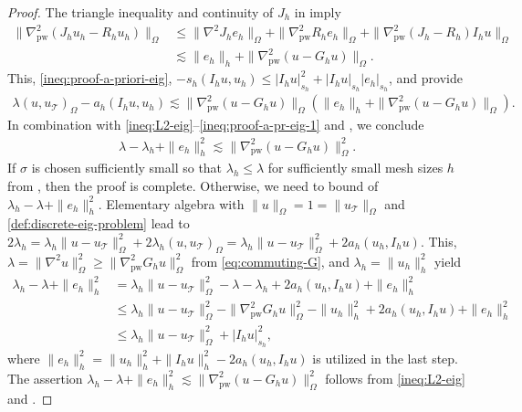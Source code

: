 \documentclass[a4paper]{amsart}
\numberwithin{equation}{section}
\def\T{\mathcal{T}}
\def\pw{\mathrm{pw}}
\theoremstyle{definition}
\theoremstyle{remark}
\numberwithin{theorem}{section}
\numberwithin{equation}{section}
\numberwithin{table}{section}
\numberwithin{figure}{section}
\begin{document}
\begin{proof}
	The triangle inequality and continuity of $J_h$ in  imply
	\begin{align*}
		\|\nabla_\pw^2(J_h u_h - R_h u_h)\|_\Omega &\leq \|\nabla^2 J_h e_h\|_\Omega + \|\nabla_\pw^2 R_h e_h\|_\Omega + \|\nabla_\pw^2 (J_h - R_h) I_h u\|_\Omega\\
		& \lesssim \|e_h\|_h + \|\nabla_\pw^2(u - G_h u)\|_\Omega.
	\end{align*}
	This, \eqref{ineq:proof-a-priori-eig}, $-s_h(I_h u, u_h) \leq |I_h u|^2_{s_h} + |I_h u|_{s_h}|e_h|_{s_h}$, and  provide
	\begin{align*}
		\lambda(u,u_\T)_{\Omega} - a_h(I_h u, u_h) \lesssim \|\nabla^2_\pw(u - G_h u)\|_\Omega(\|e_h\|_h + \|\nabla_\pw^2(u - G_h u)\|_\Omega).
	\end{align*}
	In combination with \eqref{ineq:L2-eig}--\eqref{ineq:proof-a-pr-eig-1} and , we conclude
	\begin{align*}
		\lambda - \lambda_h + \|e_h\|_h^2 \lesssim \|\nabla_\pw^2(u - G_h u)\|_\Omega^2.
	\end{align*}
	If $\sigma$ is chosen sufficiently small so that $\lambda_h \leq \lambda$ for sufficiently small mesh sizes $h$ from , then the proof is complete. Otherwise, we need to bound of $\lambda_h - \lambda + \|e_h\|_h^2$. Elementary algebra with $\|u\|_\Omega = 1 = \|u_\T\|_\Omega$ and \eqref{def:discrete-eig-problem} lead to $2 \lambda_h = \lambda_h\|u - u_\T\|^2_\Omega + 2\lambda_h(u, u_\T)_\Omega = \lambda_h\|u - u_\T\|^2_\Omega + 2a_h(u_h, I_h u)$. This, $\lambda = \|\nabla^2 u\|_\Omega^2 \geq \|\nabla_\pw^2 G_h u\|_\Omega^2$ from \eqref{eq:commuting-G}, and $\lambda_h = \|u_h\|_h^2$ yield
	\begin{align*}
		\lambda_h - \lambda + \|e_h\|_h^2 &= 
		\lambda_h\|u - u_\T\|^2_\Omega - \lambda - \lambda_h + 2a_h(u_h, I_h u) + \|e_h\|_h^2\\
		&\leq
		\lambda_h\|u - u_\T\|^2_\Omega - \|\nabla_\pw^2 G_h u\|_\Omega^2 - \|u_h\|^2_h + 2a_h(u_h, I_h u) + \|e_h\|_h^2\\
		&\leq \lambda_h\|u - u_\T\|^2_\Omega + |I_h u|_{s_h}^2,
	\end{align*}
	where $\|e_h\|_h^2 = \|u_h\|_h^2 + \|I_h u\|^2_h - 2a_h(u_h, I_h u)$ is utilized in the last step.
	The assertion $\lambda_h - \lambda + \|e_h\|_h^2 \lesssim \|\nabla_\pw^2(u - G_h u)\|^2_\Omega$ follows from \eqref{ineq:L2-eig} and .
\end{proof}
\end{document}
